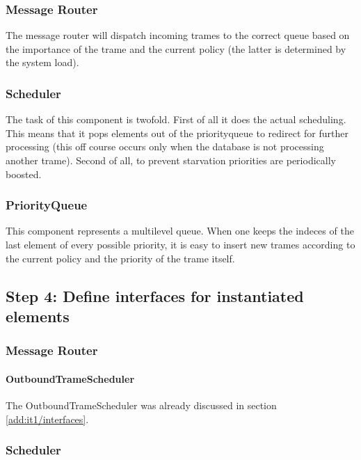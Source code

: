 \subsubsection{Message Router}
\npar The message router will dispatch incoming trames to the correct queue
based on the importance of the trame and the current policy (the latter is
determined by the system load). 

\subsubsection{Scheduler}

\npar The task of this component is twofold. First of all it does the actual
scheduling. This means that it pops elements out of the priorityqueue to
redirect for further processing (this off course occurs only when the database
is not processing another trame). Second of all, to prevent starvation
priorities are periodically boosted.

\subsubsection{PriorityQueue}

\npar This component represents a multilevel queue. When one keeps the indeces
of the last element of every possible priority, it is easy to insert new trames
according to the current policy and the priority of the trame itself.

\subsection{Step 4: Define interfaces for instantiated elements}
\label{add:it6/interfaces}

\subsubsection{Message Router}

\paragraph{OutboundTrameScheduler}

\npar The OutboundTrameScheduler was already discussed in section
\ref{add:it1/interfaces}.

\subsubsection{Scheduler}

